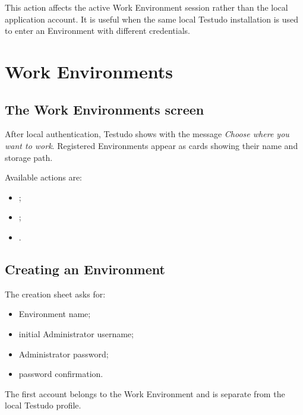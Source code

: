 \documentclass{testudomanual}
\begin{document}
This action affects the active Work Environment session rather than the local application account. It is useful when the same local Testudo installation is used to enter an Environment with different credentials.


\chapter{Work Environments}

\section{The Work Environments screen}

After local authentication, Testudo shows  with the message \emph{Choose where you want to work}. Registered Environments appear as cards showing their name and storage path.

Available actions are:
\begin{itemize}
    \item {};
    \item {};
    \item {}.
\end{itemize}

\section{Creating an Environment}

The creation sheet asks for:
\begin{itemize}
    \item Environment name;
    \item initial Administrator username;
    \item Administrator password;
    \item password confirmation.
\end{itemize}

The first account belongs to the Work Environment and is separate from the local Testudo profile.
\end{document}
